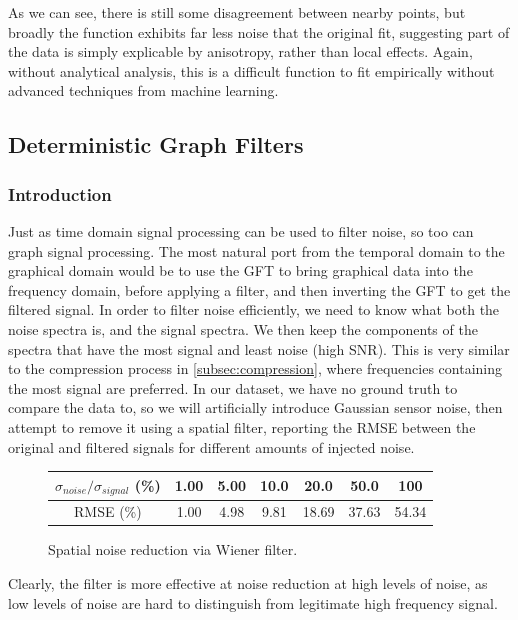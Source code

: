 \documentclass[12pt,a4paper]{article} %
\begin{document}
As we can see, there is still some disagreement between nearby points, but broadly the function exhibits far less noise that the original fit, suggesting part of the data is simply explicable by anisotropy, rather than local effects. Again, without analytical analysis, this is a difficult function to fit empirically without advanced techniques from machine learning.

\subsection{Deterministic Graph Filters}
\subsubsection{Introduction}
\label{subsec:filters_intro}
Just as time domain signal processing can be used to filter noise, so too can graph signal processing. The most natural port from the temporal domain to the graphical domain would be to use the GFT to bring graphical data into the frequency domain, before applying a filter, and then inverting the GFT to get the filtered signal. In order to filter noise efficiently, we need to know what both the noise spectra is, and the signal spectra. We then keep the components of the spectra that have the most signal and least noise (high SNR). This is very similar to the compression process in \ref{subsec:compression}, where frequencies containing the most signal are preferred. In our dataset, we have no ground truth to compare the data to, so we will artificially introduce Gaussian sensor noise, then attempt to remove it using a spatial filter, reporting the RMSE between the original and filtered signals for different amounts of injected noise.

\begin{figure}[!ht]
    \centering
    \begin{tabular}{|c|c|c|c|c|c|c|}
        \hline
        $\sigma_{noise}/\sigma_{signal}$ (\%) & 1.00 & 5.00 & 10.0 & 20.0 & 50.0 & 100 \\
        \hline
        RMSE (\%) & 1.00 & 4.98 & 9.81 & 18.69 & 37.63 & 54.34\\
        \hline
    \end{tabular}
    \caption{Spatial noise reduction via Wiener filter.}
    \label{fig:spatial_noise}
\end{figure}

Clearly, the filter is more effective at noise reduction at high levels of noise, as low levels of noise are hard to distinguish from legitimate high frequency signal.
\end{document}
